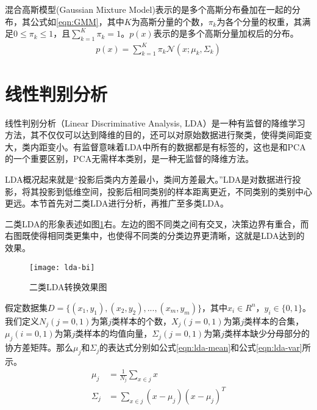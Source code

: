 混合高斯模型(Gaussian Mixture Model)表示的是多个高斯分布叠加在一起的分布，其公式如\ref{eqn:GMM}，其中$K$为高斯分量的个数，$\pi_{k}$为各个分量的权重，其满足$0 \leq \pi_{k} \leq 1$，且$\sum_{k=1}^{K}\pi_{k}=1$。$p(x)$表示的是多个高斯分量加权后的分布。
\begin{align}
\label{eqn:GMM}
p(x) = \sum_{k=1}^{K}\pi_{k}\mathcal{N}(x; \mu_{k}, \Sigma_{k})
\end{align}

\section{线性判别分析}
线性判别分析（Linear Discriminative Analysis, LDA）是一种有监督的降维学习方法，其不仅仅可以达到降维的目的，还可以对原始数据进行聚类，使得类间距变大，类内距变小。有监督意味着LDA中所有的数据都是有标签的，这也是和PCA的一个重要区别，PCA无需样本类别，是一种无监督的降维方法。

LDA概况起来就是“投影后类内方差最小，类间方差最大。”LDA是对数据进行投影，将其投影到低维空间，投影后相同类别的样本距离更近，不同类别的类别中心更远。本节首先对二类LDA进行分析，再推广至多类LDA。

二类LDA的形象表述如图\ref{fig:lda-bi}右。左边的图不同类之间有交叉，决策边界有重合，而右图既使得相同类更集中，也使得不同类的分类边界更清晰，这就是LDA达到的效果。
\begin{figure}[htbp]
  \centering
  \texttt{[image: lda-bi]}
  \caption{二类LDA转换效果图 \label{fig:lda-bi}}
\end{figure}

假定数据集$D=\{(x_1, y_1), (x_2, y_2), ..., (x_m, y_m)\}$，其中$x_i \in R^{n}$，$y_i \in \{0, 1\}$。我们定义$N_j (j=0,1)$为第$j$类样本的个数，$X_j (j=0,1)$为第$j$类样本的合集，$\mu_j (i=0,1)$为第$j$类样本的均值向量，$\Sigma_j (j=0,1)$为第$j$类样本缺少分母部分的协方差矩阵。那么$\mu_j$和$\Sigma_j$的表达式分别如公式\ref{eqn:lda-mean}和公式\ref{eqn:lda-var}所示。
\begin{align}
\mu_j &= \frac{1}{N_j} \sum_{x\in{j}} x  \label{eqn:lda-mean}\\
\Sigma_j &= \sum_{x\in{j}} (x-\mu_{j})(x-\mu_{j})^{T} \label{eqn:lda-var}
\end{align}

